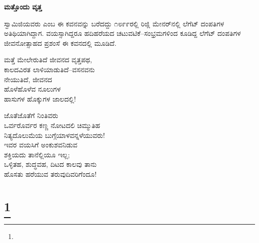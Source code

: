 \begin{myquote}
\end{myquote}

\begin{myquote}
\end{myquote}

\selectkan

\begin{center}
\textbf{ಮತ್ತೊಂದು ವೃತ್ತ}
\end{center}

ಸ್ವಾಮಿಜಿಯವರು  ಎಂಬ ಈ ಕವನವನ್ನು ಬರೆದದ್ದು ೧೮೯೯ರಲ್ಲಿ ರಿಜ್ಲಿ ಮೇನರ್‌ನಲ್ಲಿ ಲೆಗೆಟ್ ದಂಪತಿಗಳ ಅತಿಥಿಯಾಗಿದ್ದಾಗ. ವಯಸ್ಸಾಗಿದ್ದರೂ ಹದಿಹರೆಯದ ಚಟುವಟಿಕೆ–ಸಂಭ್ರಮಗಳಿಂದ ಕೂಡಿದ್ದ ಲೆಗೆಟ್ ದಂಪತಿಗಳ ಜೀವನೋತ್ಸಾಹದ ಪ್ರಶಂಸೆ ಈ ಕವನದಲ್ಲಿ ಮೂಡಿದೆ.

\begin{myquote}
ಮತ್ತೆ ಮೇಲೇರುತಿದೆ ಜೀವನದ ವೃತ್ತಪಥ,\\ಕಾಲದವಿರತ ಲಾಳಿಯಾಡುತಿದೆ–ವಸನವನು\\ನೇಯುತಿದೆ, ಜೀವನದ\\ಹೊಳೆಹೊಳೆವ ನೂಲುಗಳ\\ಹಾಸುಗಳ ಹೊಕ್ಕುಗಳ ಜಾಲದಲ್ಲಿ!
\end{myquote}

\begin{myquote}
ಜೊತೆಜೊತೆಗೆ ನಿಂತಿವರು\\ಒರ್ವರೊರ್ವರ ಕಣ್ಣ ನೋಟದಲಿ ಚಿಮ್ಮುತಿಹ\\ನಿತ್ಯದೊಲುಮೆಯ ಬುಗ್ಗೆಯಾಳವನ್ನಳೆಯುವರು!\\ಇವರ ವಯಸಿಗೆ ಅಂಕುಶವನಿಡುವ\\ಶಕ್ತಿಯದು ತಾನೆಲ್ಲಿಯೂ ಇಲ್ಲ;\\ಒಳ್ಳಿತಹ, ಶುದ್ಧವಹ, ದಿಟದ ಕಾಲವು ತಾನು\\ಹೊಸತು ಹರೆಯುವ ತರುವುದಿವರಿಗೆಂದೂ!
\end{myquote}

\selecteng

\chapter[NIRVANASHATKAM, OR SIX STANZAS ON NIRVANA]{\protect\footnote{}}

